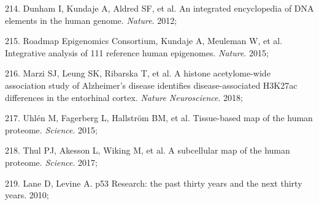\documentclass[11pt,oneside]{bristolthesis}
\newenvironment{cslreferences}%
  {}%
  {\par}
\begin{document}
\begin{cslreferences}
\leavevmode\hypertarget{ref-Dunham2012}{}%
214. Dunham I, Kundaje A, Aldred SF, et al. An integrated encyclopedia of DNA elements in the human genome. \emph{Nature}. 2012;

\leavevmode\hypertarget{ref-RoadmapEpigenomicsConsortium2015}{}%
215. Roadmap Epigenomics Consortium, Kundaje A, Meuleman W, et al. Integrative analysis of 111 reference human epigenomes. \emph{Nature}. 2015;

\leavevmode\hypertarget{ref-Marzi2018}{}%
216. Marzi SJ, Leung SK, Ribarska T, et al. A histone acetylome-wide association study of Alzheimer's disease identifies disease-associated H3K27ac differences in the entorhinal cortex. \emph{Nature Neuroscience}. 2018;

\leavevmode\hypertarget{ref-Uhlen2015}{}%
217. Uhlén M, Fagerberg L, Hallström BM, et al. Tissue-based map of the human proteome. \emph{Science}. 2015;

\leavevmode\hypertarget{ref-Thul2017}{}%
218. Thul PJ, Akesson L, Wiking M, et al. A subcellular map of the human proteome. \emph{Science}. 2017;

\leavevmode\hypertarget{ref-Lane2010}{}%
219. Lane D, Levine A. p53 Research: the past thirty years and the next thirty years. 2010;
\end{cslreferences}
\end{document}
